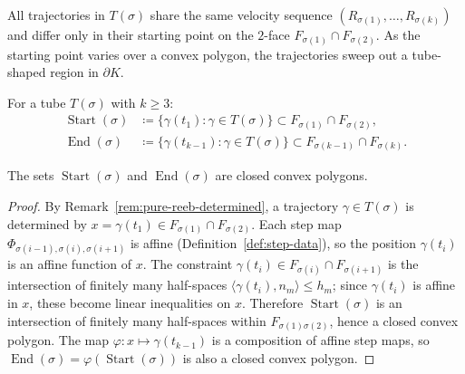 \begin{remark}\label{rem:tube-name}
All trajectories in $T(\sigma)$ share the same velocity sequence
$(R_{\sigma(1)}, \ldots, R_{\sigma(k)})$
and differ only in their starting point on the $2$-face
$F_{\sigma(1)} \cap F_{\sigma(2)}$.
As the starting point varies over a convex polygon,
the trajectories sweep out a tube-shaped region in $\partial K$.
\end{remark}

\begin{definition}\label{def:tube-endpoints}
For a tube $T(\sigma)$ with $k \geq 3$:
\begin{align*}
  \operatorname{Start}(\sigma) &\coloneqq
    \{ \gamma(t_1) : \gamma \in T(\sigma) \}
    \subset F_{\sigma(1)} \cap F_{\sigma(2)}, \\
  \operatorname{End}(\sigma) &\coloneqq
    \{ \gamma(t_{k-1}) : \gamma \in T(\sigma) \}
    \subset F_{\sigma(k-1)} \cap F_{\sigma(k)}.
\end{align*}
\end{definition}

\begin{lemma}\label{lem:tube-convex}
The sets $\operatorname{Start}(\sigma)$ and $\operatorname{End}(\sigma)$
are closed convex polygons.
\end{lemma}

\begin{proof}
By Remark~\ref{rem:pure-reeb-determined},
a trajectory $\gamma \in T(\sigma)$ is determined by
$x = \gamma(t_1) \in F_{\sigma(1)} \cap F_{\sigma(2)}$.
Each step map $\Phi_{\sigma(i-1),\sigma(i),\sigma(i+1)}$
is affine (Definition~\ref{def:step-data}),
so the position $\gamma(t_i)$ is an affine function of $x$.
The constraint $\gamma(t_i) \in F_{\sigma(i)} \cap F_{\sigma(i+1)}$
is the intersection of finitely many half-spaces
$\langle \gamma(t_i), n_m \rangle \leq h_m$;
since $\gamma(t_i)$ is affine in $x$,
these become linear inequalities on $x$.
Therefore $\operatorname{Start}(\sigma)$ is an intersection of
finitely many half-spaces within $F_{\sigma(1)\sigma(2)}$,
hence a closed convex polygon.
The map $\varphi \colon x \mapsto \gamma(t_{k-1})$
is a composition of affine step maps,
so $\operatorname{End}(\sigma) = \varphi(\operatorname{Start}(\sigma))$
is also a closed convex polygon.
\end{proof}

